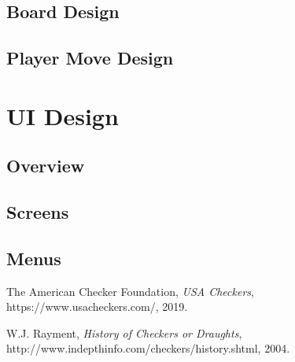 \documentclass{scrreprt}
\begin{document}
	\section{Board Design}
	\section{Player Move Design}

\chapter{UI Design}
	\section{Overview}
	\section{Screens}
	\section{Menus}

\begin{thebibliography}{9}

  The American Checker Foundation,
  \textit{USA Checkers},
  https://www.usacheckers.com/,
  2019.

W.J. Rayment,
\textit{History of Checkers or Draughts},
http://www.indepthinfo.com/checkers/history.shtml,
2004.

\end{thebibliography}
\end{document}
